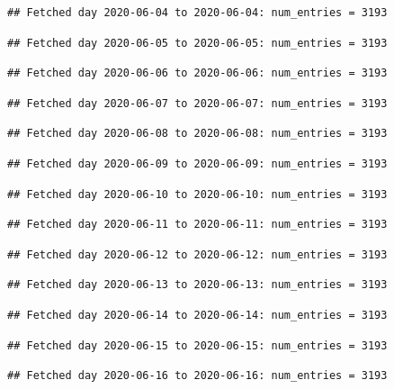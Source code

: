 \documentclass[]{article}
\begin{document}
\begin{verbatim}
## Fetched day 2020-06-04 to 2020-06-04: num_entries = 3193
\end{verbatim}

\begin{verbatim}
## Fetched day 2020-06-05 to 2020-06-05: num_entries = 3193
\end{verbatim}

\begin{verbatim}
## Fetched day 2020-06-06 to 2020-06-06: num_entries = 3193
\end{verbatim}

\begin{verbatim}
## Fetched day 2020-06-07 to 2020-06-07: num_entries = 3193
\end{verbatim}

\begin{verbatim}
## Fetched day 2020-06-08 to 2020-06-08: num_entries = 3193
\end{verbatim}

\begin{verbatim}
## Fetched day 2020-06-09 to 2020-06-09: num_entries = 3193
\end{verbatim}

\begin{verbatim}
## Fetched day 2020-06-10 to 2020-06-10: num_entries = 3193
\end{verbatim}

\begin{verbatim}
## Fetched day 2020-06-11 to 2020-06-11: num_entries = 3193
\end{verbatim}

\begin{verbatim}
## Fetched day 2020-06-12 to 2020-06-12: num_entries = 3193
\end{verbatim}

\begin{verbatim}
## Fetched day 2020-06-13 to 2020-06-13: num_entries = 3193
\end{verbatim}

\begin{verbatim}
## Fetched day 2020-06-14 to 2020-06-14: num_entries = 3193
\end{verbatim}

\begin{verbatim}
## Fetched day 2020-06-15 to 2020-06-15: num_entries = 3193
\end{verbatim}

\begin{verbatim}
## Fetched day 2020-06-16 to 2020-06-16: num_entries = 3193
\end{verbatim}
\end{document}
